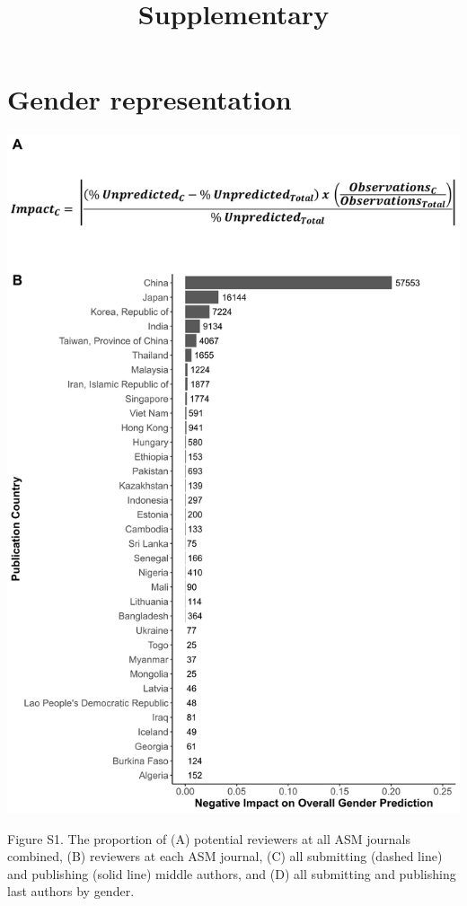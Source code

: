 \documentclass[11pt,]{article}
\title{Supplementary}
\author{}
\date{}
\begin{document}
\maketitle

\section{Gender representation}\label{gender-representation}

\includegraphics{Figure_S1.png}

Figure S1. The proportion of (A) potential reviewers at all ASM journals
combined, (B) reviewers at each ASM journal, (C) all submitting (dashed
line) and publishing (solid line) middle authors, and (D) all submitting
and publishing last authors by gender.
\end{document}
